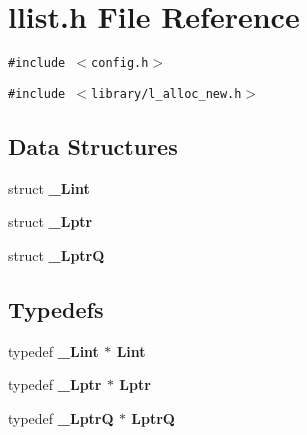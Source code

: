 \section{llist.h File Reference}
\label{llist_8h}
{\tt \#include $<$config.h$>$}\par
{\tt \#include $<$library/l\_\-alloc\_\-new.h$>$}\par
\subsection*{Data Structures}
\begin{CompactItemize}
\item 
struct \bf{\_\-Lint}
\item 
struct \bf{\_\-Lptr}
\item 
struct \bf{\_\-Lptr\-Q}
\end{CompactItemize}
\subsection*{Typedefs}
\begin{CompactItemize}
\item 
typedef \bf{\_\-Lint} $\ast$ \bf{Lint}
\item 
typedef \bf{\_\-Lptr} $\ast$ \bf{Lptr}
\item 
typedef \bf{\_\-Lptr\-Q} $\ast$ \bf{Lptr\-Q}
\end{CompactItemize}
